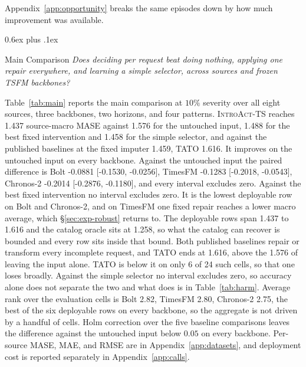 \documentclass{article}
\makeatletter
\newcommand{\introact}{\textsc{IntroAct-TS}}
\newcommand{\tsfm}{TSFM}
\def\subsection{\@startsection{subsection}{2}{\z@}{-1.4ex plus -0.4ex minus -.2ex}%
  {0.6ex plus .1ex}{\normalsize\sc\raggedright}}
\makeatother
\begin{document}
Appendix~\ref{app:opportunity} breaks the same episodes down by how much improvement was
available.

\subsection{Main Comparison}
\label{sec:exp-main}
\emph{Does deciding per request beat doing nothing, applying one repair everywhere, and
learning a simple selector, across sources and frozen \tsfm{} backbones?}

Table~\ref{tab:main} reports the main comparison at $10\%$ severity over all eight sources,
three backbones, two horizons, and four patterns. \introact{} reaches 1.437 source-macro MASE against 1.576 for the untouched input, 1.488 for the best fixed intervention and 1.458 for the simple selector, and against the published baselines at the fixed imputer 1.459, TATO 1.616. It improves on the untouched input on every backbone.
Against the untouched input the paired difference is Bolt -0.0881 [-0.1530, -0.0256], TimesFM -0.1283 [-0.2018, -0.0543], Chronos-2 -0.2014 [-0.2876, -0.1180], and every interval excludes zero. Against the best fixed intervention no interval excludes zero. It is the lowest deployable row on Bolt and Chronos-2, and on TimesFM one fixed repair reaches a lower macro average, which \S\ref{sec:exp-robust} returns to. The deployable rows span 1.437 to 1.616 and the catalog oracle sits at 1.258, so what the catalog can recover is bounded and every row sits inside that bound. Both published baselines repair or transform every incomplete request, and TATO ends at 1.616, above the 1.576 of leaving the input alone. TATO is below it on only 6 of 24 such cells, so that one loses broadly. Against the simple selector no interval excludes zero, so accuracy alone does not separate the two and what does is in Table~\ref{tab:harm}.
Average rank over the evaluation cells is Bolt 2.82, TimesFM 2.80, Chronos-2 2.75, the best of the six deployable rows on every backbone, so the aggregate is not driven by a handful of cells. Holm correction over the five baseline comparisons leaves the difference against the untouched input below $0.05$ on every backbone.
Per-source MASE, MAE, and RMSE are in Appendix~\ref{app:datasets}, and
deployment cost is reported separately in Appendix~\ref{app:calls}.
\end{document}
